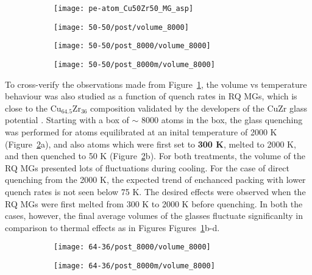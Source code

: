 \begin{figure}
	\begin{subfigure}{\linewidth} \centering
		\texttt{[image: pe-atom\_Cu50Zr50\_MG\_asp]}
	\end{subfigure}	%
	\vfill
	\begin{subfigure}{0.33\textwidth}
		\texttt{[image: 50-50/post/volume\_8000]}
	\end{subfigure}%
	\hfill
	\begin{subfigure}{0.33\textwidth}
		\texttt{[image: 50-50/post\_8000/volume\_8000]}
	\end{subfigure}%
	\hfill
	\begin{subfigure}{0.33\textwidth}
		\texttt{[image: 50-50/post\_8000m/volume\_8000]}
	\end{subfigure}
	\label{f:vol_quench}
\end{figure}

To cross-verify the observations made from Figure~\ref{f:vol_quench}, the volume vs temperature behaviour was also studied as a function of quench rates in \czsix RQ MGs, which is close to the Cu$_{64.5}$Zr$_{36}$ composition validated by the developers of the CuZr glass potential \cite{Mendelev2019}. Starting with a box of $\sim$ 8000 atoms in the box, the glass quenching was performed for atoms equilibrated at an inital temperature of 2000 K (Figure~\ref{f:vol_quench64}a), and also atoms which were first set to \textbf{300 K}, melted to 2000 K, and then quenched to 50 K (Figure~\ref{f:vol_quench64}b). For both treatments, the volume of the RQ MGs presented lots of fluctuations during cooling. For the case of direct quenching from the 2000 K, the expected trend of enchanced packing with lower quench rates is not seen below 75 K. The desired effects were observed when the \czsix RQ MGs were first melted from 300 K to 2000 K before quenching. In both the cases, however, the final average volumes of the glasses fluctuate significanlty in comparison to thermal effects as in Figures Figures~\ref{f:vol_quench}b-d.  \par 

\begin{figure}
	\begin{subfigure}{0.44\textwidth}
		\texttt{[image: 64-36/post\_8000/volume\_8000]}
	\end{subfigure}%
	\hfill
	\begin{subfigure}{0.44\textwidth}
		\texttt{[image: 64-36/post\_8000m/volume\_8000]}
	\end{subfigure}
	\label{f:vol_quench64}
\end{figure}

